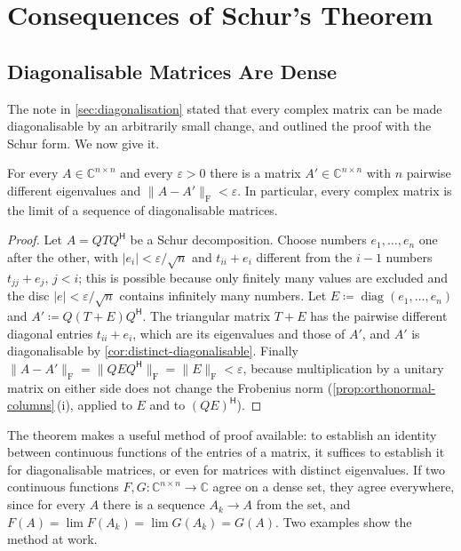 \section{Consequences of Schur's Theorem}
\label{sec:schur-consequences}

\subsection{Diagonalisable Matrices Are Dense}

The note in \cref{sec:diagonalisation} stated that every complex matrix can be made diagonalisable by an arbitrarily small change, and outlined the proof with the Schur form. We now give it.

\begin{theorem}
\label{thm:diagonalisable-dense}
For every $A\in\mathbb C^{n\times n}$ and every $\varepsilon>0$ there is a matrix $A'\in\mathbb C^{n\times n}$ with $n$ pairwise different eigenvalues and $\|A-A'\|_{\mathrm F}<\varepsilon$. In particular, every complex matrix is the limit of a sequence of diagonalisable matrices.
\end{theorem}

\begin{proof}
Let $A=QTQ^{\mathsf H}$ be a Schur decomposition. Choose numbers $e_1,\ldots,e_n$ one after the other, with $|e_i|<\varepsilon/\sqrt n$ and $t_{ii}+e_i$ different from the $i-1$ numbers $t_{jj}+e_j$, $j<i$; this is possible because only finitely many values are excluded and the disc $|e|<\varepsilon/\sqrt n$ contains infinitely many numbers. Let $E\coloneqq\operatorname{diag}(e_1,\ldots,e_n)$ and $A'\coloneqq Q(T+E)Q^{\mathsf H}$. The triangular matrix $T+E$ has the pairwise different diagonal entries $t_{ii}+e_i$, which are its eigenvalues and those of $A'$, and $A'$ is diagonalisable by \cref{cor:distinct-diagonalisable}. Finally $\|A-A'\|_{\mathrm F}=\|QEQ^{\mathsf H}\|_{\mathrm F}=\|E\|_{\mathrm F}<\varepsilon$, because multiplication by a unitary matrix on either side does not change the Frobenius norm (\cref{prop:orthonormal-columns}\,(i), applied to $E$ and to $(QE)^{\mathsf H}$).
\end{proof}

The theorem makes a useful method of proof available: to establish an identity between continuous functions of the entries of a matrix, it suffices to establish it for diagonalisable matrices, or even for matrices with distinct eigenvalues. If two continuous functions $F,G\colon\mathbb C^{n\times n}\to\mathbb C$ agree on a dense set, they agree everywhere, since for every $A$ there is a sequence $A_k\to A$ from the set, and $F(A)=\lim F(A_k)=\lim G(A_k)=G(A)$. Two examples show the method at work.

